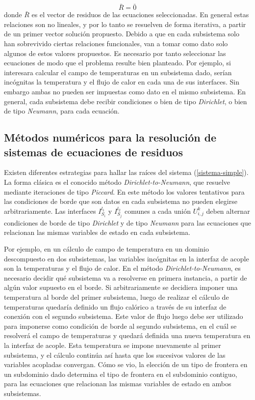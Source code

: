 \begin{equation}
\bar{R}=\bar{0}
\label{sistema-simple}
\end{equation}
donde $\bar{R}$ es el vector de residuos de las ecuaciones seleccionadas.
En general estas relaciones son no lineales, y por lo tanto se resuelven de forma iterativa, a partir de un primer vector solución propuesto.
Debido a que en cada subsistema solo han sobrevivido ciertas relaciones funcionales, 
van a tomar como dato solo algunos de estos valores propuestos.
Es necesario por tanto seleccionar las ecuaciones de modo que el problema resulte bien planteado.
Por ejemplo, si interesara calcular el campo de temperaturas en un subsistema dado,
serían incógnitas la temperatura y el flujo de calor en cada una de sus interfaces.
Sin embargo ambas no pueden ser impuestas como dato en el mismo subsistema.
En general, cada subsistema debe recibir condiciones o bien de tipo \textit{Dirichlet}, o bien de tipo \textit{Neumann}, para cada ecuación.

\subsection{Métodos numéricos para la resolución de sistemas de ecuaciones de residuos}
\label{1:metodos}
Existen diferentes estrategias para hallar las raíces del sistema (\ref{sistema-simple}). 
La forma clásica es el conocido método \textit{Dirichlet-to-Neumann}, que resuelve mediante iteraciones de tipo \textit{Piccard}.
En este método los valores tentativos para las condiciones de borde que son datos en cada subsistema no pueden elegirse arbitrariamente. 
Las interfaces $I_{S_i}^{l_1}$ y $I_{S_j}^{l_2}$ comunes a cada unión $U_{i,j}^k$ 
deben alternar condiciones de borde de tipo \textit{Dirichlet} y de tipo \textit{Neumann} para las ecuaciones que relacionan las mismas variables de estado en cada subsistema.

Por ejemplo, en un cálculo de campo de temperatura en un dominio descompuesto en dos subsistemas,
las variables incógnitas en la interfaz de acople son la temperaturas y el flujo de calor.
En el método \textit{Dirichlet-to-Neumann}, es necesario decidir qué subsistema va a resolverse en primera instancia, a partir de algún valor supuesto en el borde.
Si arbitrariamente se decidiera imponer una temperatura al borde del primer subsistema,
luego de realizar el cálculo de temperaturas quedaría definido un flujo calórico a través de su interfaz de conexión con el segundo subsistema.
Este valor de flujo luego debe ser utilizado para imponerse como condición de borde al segundo subsistema,
en el cuál se resolverá el campo de temperaturas y quedará definida una nueva temperatura en la interfaz de acople.
Esta temperatura se impone nuevamente al primer subsistema, y el cálculo continúa así hasta que los sucesivos valores de las variables acopladas convergan.
Cómo se vio, la elección de un tipo de frontera en un subdominio dado determina el tipo de frontera en el subdominio contiguo,
para las ecuaciones que relacionan las mismas variables de estado en ambos subsistemas.

